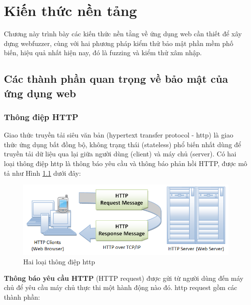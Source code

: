\chapter{Kiến thức nền tảng}
Chương này trình bày các kiến thức nền tằng về ứng dụng web cần thiết để xây dựng webfuzzer, cùng với hai phương pháp kiểm thử bảo mật phần mềm phố biến, hiệu quả nhất hiện nay, đó là fuzzing và kiểm thử xâm nhập.
\section{Các thành phần quan trọng về bảo mật của ứng dụng web}
\subsection[Thông điệp HTTP]{Thông điệp HTTP}
Giao thức truyền tải siêu văn bản (hypertext transfer protocol - \acrshort{http}) là giao thức ứng dụng bất đồng bộ, không trạng thái (stateless) phổ biến nhất dùng để truyền tải dữ liệu qua lại giữa người dùng (client) và máy chủ (server). Có hai loại thông điệp \acrshort{http} là thông báo yêu cầu và thông báo phản hồi HTTP, được mô tả như Hình \ref{fig:http} dưới đây:
\begin{figure}[H]
  \centering
    \includegraphics[width=\textwidth,keepaspectratio=true]{images/http.png}
  \caption[Hai loại thông điệp HTTP]{Hai loại thông điệp \acrshort{http}\protect\footnotemark}
  \label{fig:http}
\end{figure}
\textbf{Thông báo yêu cầu HTTP} (HTTP request) được gửi từ người dùng đến máy chủ để yêu cầu máy chủ thực thi một hành động nào đó. \acrshort{http} request gồm các thành phần:
